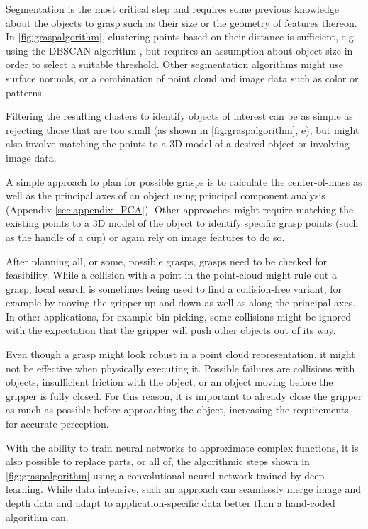 Segmentation is the most critical step and requires some previous knowledge about the objects to grasp such as their size or the geometry of features thereon. In \cref{fig:graspalgorithm}, clustering points based on their distance is sufficient, e.g. using the DBSCAN algorithm \cite{ester1996density}, but requires an assumption about object size in order to select a suitable threshold. Other segmentation algorithms might use surface normals, or a combination of point cloud and image data such as color or patterns.

Filtering the resulting clusters to identify objects of interest can be as simple as rejecting those that are too small (as shown in \cref{fig:graspalgorithm}, e), but might also involve matching the points to a 3D model of a desired object or involving image data.

A simple approach to plan for possible grasps is to calculate the center-of-mass as well as the principal axes of an object using principal component analysis (Appendix \ref{sec:appendix_PCA}). Other approaches might require matching the existing points to a 3D model of the object to identify specific grasp points (such as the handle of a cup) or again rely on image features to do so.

After planning all, or some, possible grasps, grasps need to be checked for feasibility. While a collision with a point in the point-cloud might rule out a grasp, local search is sometimes being used to find a collision-free variant, for example by moving the gripper up and down as well as along the principal axes. In other applications, for example bin picking, some collisions might be ignored with the expectation that the gripper will push other objects out of its way.

Even though a grasp might look robust in a point cloud representation, it might not be effective when physically executing it. Possible failures are collisions with objects, insufficient friction with the object, or an object moving before the gripper is fully closed. For this reason, it is important to already close the gripper as much as possible before approaching the object, increasing the requirements for accurate perception.

With the ability to train neural networks to approximate complex functions, it is also possible to replace parts, or all of, the algorithmic steps shown in \cref{fig:graspalgorithm} using a convolutional neural network trained by deep learning. While data intensive, such an approach can seamlessly merge image and depth data and adapt to application-specific data better than a hand-coded algorithm can.

